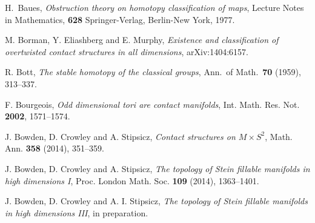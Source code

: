 \documentclass[12pt]{amsart}
\theoremstyle{remark}
\newcommand{\dccomm}[1]{\begingroup\color{blue}DC:~#1\endgroup}
\begin{document}
\begin{thebibliography}{999}




 H.~Baues, {\em Obstruction theory on homotopy classification of maps},  Lecture Notes in Mathematics, {\bf 628} Springer-Verlag, Berlin{-}New York, 1977.



 M. Borman, Y. Eliashberg and  E. Murphy,
{\em Existence and classification of overtwisted contact structures in all dimensions}, arXiv:1404:6157.

 R. Bott, {\em The stable homotopy of the classical groups}, 
Ann.~of Math.~{\bf 70} (1959), 313--337.

 F. Bourgeois, {\em Odd dimensional tori are contact manifolds}, Int. Math. Res. Not. {\bf 2002}, 1571--1574.

 J. Bowden, D. Crowley and A.  Stipsicz, 
{\em Contact structures on $M \times S^2$}, Math. Ann. {\bf358} (2014), 351--359.

 J. Bowden, D. Crowley and A.  Stipsicz, 
{\em The topology of Stein fillable manifolds in high dimensions I},
Proc. London Math. Soc. {\bf109}  (2014),  1363--1401. 

J. Bowden, D. Crowley and A. I. Stipsicz, 
{\em The topology of Stein fillable manifolds in high dimensions III}, in 
preparation.



\end{thebibliography}
\end{document}
